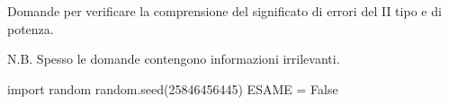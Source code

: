 \documentclass[11pt,twoside,a4paper]{article}
\def\Pr{{\rm Pr\,}}
\newcounter{quesito}
\newenvironment{question}{\bigskip\addtocounter{quesito}{1}\par\textbf{Quesito \thequesito.\kern1ex}}{\vspace{\parskip}}
\newenvironment{answer}{\par\textbf{Risposta\quad}}{\vspace{\parskip}}
\begin{document}
\colorbox{blue!10}{\begin{minipage}{\textwidth}
Domande per verificare la comprensione del significato di errori del II tipo e di potenza.\bigskip

N.B. Spesso le domande contengono informazioni irrilevanti.
\end{minipage}}

\bigskip\bigskip

\begin{pycode}
import random
random.seed(25846456445)
ESAME = False
\end{pycode}

% 
% 
% 
% 
% 
% 
% 
% 
% 
% 
\end{document}
